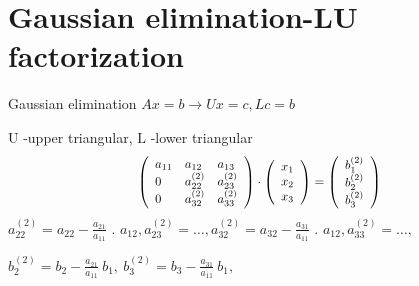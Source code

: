 \section{Gaussian elimination-LU factorization}
\begin{frame}{Gaussian elimination}
$Ax=b\rightarrow Ux=c, Lc=b$

$\mathrm{U}$ -upper triangular, $\mathrm{L}$ -lower triangular
$$
\scalebox{0.90}{
$
\left(\begin{array}{lll}
a_{11} & a_{12} & a_{13}\\
0 & a_{22}^{(2)} &a_{23}^{(2)}\\
0 & a_{32}^{(2)} & a_{33}^{(2)}
\end{array}\right) \cdot
 \left(\begin{array}{l}
x_{1}\\
x_{2}\\
x_{3}
\end{array}\right)=
\left(\begin{array}{l}
b_{1}^{(2)} \\
b_{2}^{(2)} \\
b_{3}^{(2)}
\end{array}\right)
$
}
$$
$a_{22}^{(2)}=a_{22}-\displaystyle \frac{a_{21}}{a_{11}}$ . $a_{12}, a_{23}^{(2)}=\ldots, a_{32}^{(2)}=a_{32}-\displaystyle \frac{a_{31}}{a_{11}}$ . $a_{12}, a_{33}^{(2)}=\ldots,$

\begin{flushright}
$
b_{2}^{(2)}=b_{2}-\frac{a_{21}}{a_{11}}\ b_{1},\ b_{3}^{(2)}=b_{3}-\frac{a_{31}}{a_{11}}\ b_{1},
$
\end{flushright}

\end{frame}
